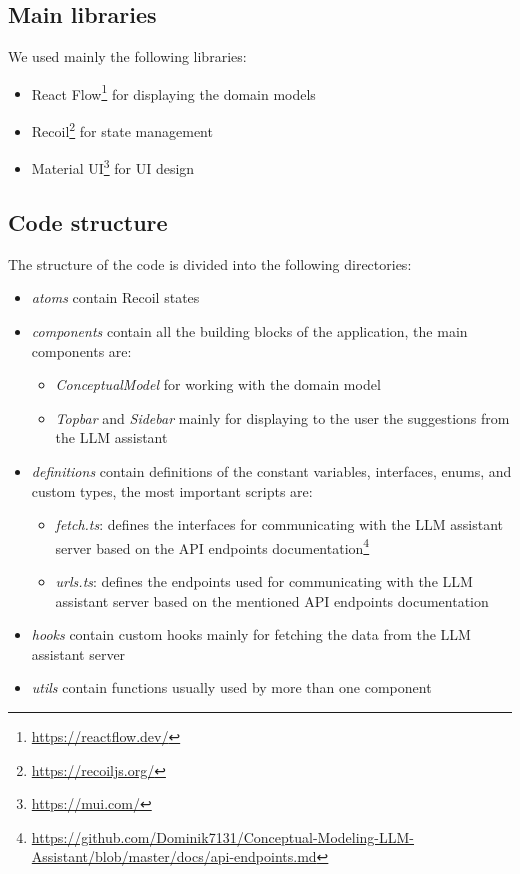 \subsection{Main libraries}

\noindent{}We used mainly the following libraries:
\begin{itemize}
\item React Flow\footnote{\url{https://reactflow.dev/}} for displaying the domain models
\item Recoil\footnote{\url{https://recoiljs.org/}} for state management
\item Material UI\footnote{\url{https://mui.com/}} for UI design
\end{itemize}


\subsection{Code structure}

\noindent{}The structure of the code is divided into the following directories:
\begin{itemize}
\item \textit{atoms} contain Recoil states
\item \textit{components} contain all the building blocks of the application, the main components are:
\begin{itemize}
\item \textit{ConceptualModel} for working with the domain model
\item \textit{Topbar} and \textit{Sidebar} mainly for displaying to the user the suggestions from the LLM assistant
\end{itemize}
\item \textit{definitions} contain definitions of the constant variables, interfaces, enums, and custom types, the most important scripts are:
\begin{itemize}
\item \textit{fetch.ts}: defines the interfaces for communicating with the LLM assistant server based on the API endpoints documentation\footnote{\url{https://github.com/Dominik7131/Conceptual-Modeling-LLM-Assistant/blob/master/docs/api-endpoints.md}}
\item \textit{urls.ts}: defines the endpoints used for communicating with the LLM assistant server based on the mentioned API endpoints documentation
\end{itemize}
\item \textit{hooks} contain custom hooks mainly for fetching the data from the LLM assistant server
\item \textit{utils} contain functions usually used by more than one component
\end{itemize}


